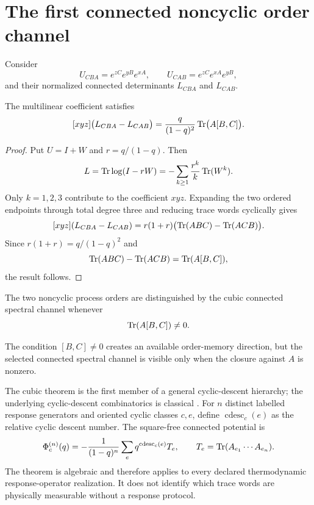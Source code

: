 \section{The first connected noncyclic order channel}

Consider
\[
 U_{CBA}=e^{zC}e^{yB}e^{xA},
 \qquad
 U_{CAB}=e^{zC}e^{xA}e^{yB},
\]
and their normalized connected determinants $L_{CBA}$ and $L_{CAB}$.

\begin{theorem}\label{thm:cubic-channel}
The multilinear coefficient satisfies
\[
 [xyz]\bigl(L_{CBA}-L_{CAB}\bigr)
 =\frac{q}{(1-q)^2}\operatorname{Tr}\bigl(A[B,C]\bigr).
\]
\end{theorem}

\begin{proof}
Put $U=I+W$ and $r=q/(1-q)$. Then
\[
 L=\operatorname{Tr}\log(I-rW)
 =-\sum_{k\ge1}\frac{r^k}{k}\operatorname{Tr}(W^k).
\]
Only $k=1,2,3$ contribute to the coefficient $xyz$. Expanding the two ordered endpoints through total degree three and reducing trace words cyclically gives
\[
 [xyz](L_{CBA}-L_{CAB})
 =r(1+r)\bigl(\operatorname{Tr}(ABC)-\operatorname{Tr}(ACB)\bigr).
\]
Since $r(1+r)=q/(1-q)^2$ and
\[
 \operatorname{Tr}(ABC)-\operatorname{Tr}(ACB)=\operatorname{Tr}(A[B,C]),
\]
the result follows.
\end{proof}

\begin{corollary}
The two noncyclic process orders are distinguished by the cubic connected spectral channel whenever
\[
 \operatorname{Tr}(A[B,C])\ne0.
\]
\end{corollary}

\begin{remark}
The condition $[B,C]\ne0$ creates an available order-memory direction, but the selected connected spectral channel is visible only when the closure against $A$ is nonzero.
\end{remark}

The cubic theorem is the first member of a general cyclic-descent hierarchy; the underlying cyclic-descent combinatorics is classical \cite{petersen2005}. For $n$ distinct labelled response generators and oriented cyclic classes $c,e$, define $\operatorname{cdesc}_c(e)$ as the relative cyclic descent number. The square-free connected potential is
\[
 \Phi_c^{(n)}(q)
 =-\frac{1}{(1-q)^n}
 \sum_e q^{\operatorname{cdesc}_c(e)}T_e,
 \qquad
 T_e=\operatorname{Tr}(A_{e_1}\cdots A_{e_n}).
\]
The theorem is algebraic and therefore applies to every declared thermodynamic response-operator realization. It does not identify which trace words are physically measurable without a response protocol.

